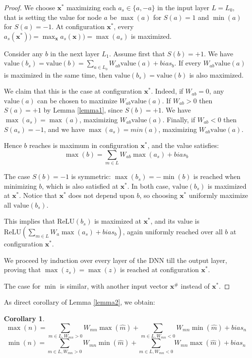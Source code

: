 \documentclass[]{article}
\newtheorem{corollary}{Corollary}
\theoremstyle{definition}
\newcommand{\ReLU}{\mathrm{ReLU}}
\newcommand{\Val}{\mathrm{value}}
\begin{document}
\begin{proof}
We choose $\boldsymbol{x}^*$ maximizing each $a_s \in \{a,-a\}$ in the input layer $L=L_0$,
	that is setting the value for node $a$ be $\max(a)$ for $S(a)=1$ and $\min(a)$ for $S(a)=-1$.
At configuration $\boldsymbol{x}^*$, every $a_s(\boldsymbol{x}^*))=\max_{\boldsymbol{x}} {a_s(\boldsymbol{x}))}=\max(a_s)$ is maximized.  

Consider any $b$ in the next layer $L_1$.
Assume first that $S(b)=+1$.
We have $\Val(b_s)= \Val(b) = \sum_{a \in L_0} W_{ab} \Val(a) + bias_b$.
If every $W_{ab} \Val(a)$ is maximized in the same time, 
then $\Val(b_s)= \Val(b)$ is also maximized. 

We claim that this is the case at 
configuration $\boldsymbol{x}^*$.
Indeed, if $W_{ab}=0$, any $\Val(a)$ can be chosen to maximize 
$W_{ab}\Val(a)$. If $W_{ab}>0$ then $S(a) = +1$ by Lemma \ref{lemma1}, since
$S(b)=+1$. We have $\max(a_s) = \max(a)$, maximizing $W_{ab}\Val(a)$.
Finally, if $W_{a b}<0$ then $S(a_s) = -1$, and we have 
$\max(a_s) = min(a)$, maximizing $W_{ab}\Val(a)$.

Hence $b$ reaches is maximum in configuration $\boldsymbol{x}^*$, and the value satisfies: 
$$\max(b)=\sum_{m \in L}W_{a b} \max(a_s)+bias_b$$

The case $S(b)=-1$ is symmetric:
$\max(b_s)= -\min(b)$ is reached when minimizing $b$, which is also 
satisfied at $\boldsymbol{x}^*$.
In both case, $\Val(b_s)$ is maximized at $\boldsymbol{x}^*$. Notice that $\boldsymbol{x}^*$ does not depend upon $b$, so choosing $\boldsymbol{x}^*$ uniformly maximize all $\Val(b_s)$.

This implies that $\ReLU(b_s)$ is maximized at $\boldsymbol{x}^*$, and its value is 
$\ReLU(\sum_{m \in L}W_{a }\max(a_s)+bias_b)$, again uniformly reached over all $b$ at configuration $\boldsymbol{x}^*$.

We proceed by induction over every layer of the DNN till the output layer, proving that 
$\max(z_s)=\max(z)$ is reached at configuration $\boldsymbol{x}^*$.

The case for $\min$ is similar, with another input vector $\boldsymbol{x}^\#$ instead of $\boldsymbol{x}^*$.
\end{proof}

As direct corollary of Lemma \ref{lemma2}, we obtain:

\begin{corollary}
	\label{cor1}
	$$\max(n)=\sum_{m \in L, W_{m n}>0}W_{m n} \max(\hat{m}) + \sum_{m \in L, W_{m n}<0}W_{mn} \min(\hat{m}) + bias_n$$
	$$\min(n)=\sum_{m \in L, W_{m n}>0}W_{m n} \min(\hat{m}) + \sum_{m \in L, W_{m n}<0}W_{mn} \max(\hat{m}) + bias_n$$
\end{corollary}
	
\end{document}
